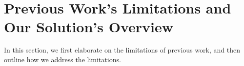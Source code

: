 
\section{Previous Work's Limitations and Our Solution's Overview}\label{sec::previous-work-limitations}
In this section, we first elaborate on the limitations of previous  work, and then outline how we address the limitations.  



